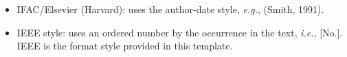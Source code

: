 \documentclass[11pt,twoside]{thesis_proposal-fiet_unicauca} %
\newcommand{\eg}{\textit{e.g.}, }
\newcommand{\ie}{\textit{i.e.}, }
\begin{document}
\begin{itemize}
    \item IFAC/Elsevier (Harvard): uses the author-date style, \eg (Smith, 1991).
    \item IEEE style: uses an ordered number by the occurrence in the text, \ie [No.]. IEEE is the format style provided in this template.
\end{itemize}

\small


\makeagreement
\end{document}
